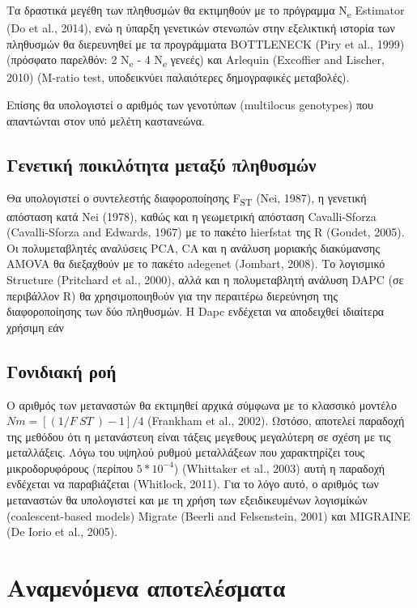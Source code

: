 \documentclass[12pt,a4paper,]{report}
\begin{document}
Τα δραστικά μεγέθη των πληθυσμών θα εκτιμηθούν με το πρόγραμμα
N\textsubscript{e} Estimator (Do et al., 2014), ενώ η ύπαρξη γενετικών
στενωπών στην εξελικτική ιστορία των πληθυσμών θα διερευνηθεί με τα
προγράμματα BOTTLENECK (Piry et al., 1999) (πρόσφατο παρελθόν: 2
N\textsubscript{e} - 4 N\textsubscript{e} γενεές) και Arlequin
(Excoffier and Lischer, 2010) (M-ratio test, υποδεικνύει παλαιότερες
δημογραφικές μεταβολές).

Επίσης θα υπολογιστεί ο αριθμός των γενοτύπων (multilocus genotypes) που
απαντώνται στον υπό μελέτη καστανεώνα.

\hypertarget{---}{%
\subsection{Γενετική ποικιλότητα μεταξύ πληθυσμών}\label{---}}

Θα υπολογιστεί ο συντελεστής διαφοροποίησης F\textsubscript{ST} (Nei,
1987), η γενετική απόσταση κατά Nei (1978), καθώς και η γεωμετρική
απόσταση Cavalli-Sforza (Cavalli-Sforza and Edwards, 1967) με το πακέτο
hierfstat της R (Goudet, 2005). Οι πολυμεταβλητές αναλύσεις PCA, CA και
η ανάλυση μοριακής διακύμανσης AMOVA θα διεξαχθούν με το πακέτο adegenet
(Jombart, 2008). Το λογισμικό Structure (Pritchard et al., 2000), αλλά
και η πολυμεταβλητή ανάλυση DAPC (σε περιβάλλον R) θα χρησιμοποιηθoύν
για την περαιτέρω διερεύνηση της διαφοροποίησης των δύο πληθυσμών. H
Dapc ενδέχεται να αποδειχθεί ιδιαίτερα χρήσιμη εάν

\hypertarget{-}{%
\subsection{Γονιδιακή ροή}\label{-}}

Ο αριθμός των μεταναστών θα εκτιμηθεί αρχικά σύμφωνα με το κλασσικό
μοντέλο \(Nm = [(1 / F~ST~) - 1] / 4\) (Frankham et al., 2002). Ωστόσο,
αποτελεί παραδοχή της μεθόδου ότι η μετανάστευη είναι τάξεις μεγεθους
μεγαλύτερη σε σχέση με τις μεταλλάξεις. Λόγω του υψηλού ρυθμού
μεταλλάξεων που χαρακτηρίζει τους μικροδορυφόρους (περίπου
\(5 * 10^{-4}\)) (Whittaker et al., 2003) αυτή η παραδοχή ενδέχεται να
παραβιάζεται (Whitlock, 2011). Για το λόγο αυτό, ο αριθμός των
μεταναστών θα υπολογιστεί και με τη χρήση των εξειδικευμένων λογισμίκών
(coalescent-based models) Migrate (Beerli and Felsenstein, 2001) και
MIGRAINE (De Iorio et al., 2005).

\hypertarget{-}{%
\section{Αναμενόμενα αποτελέσματα}\label{-}}
\end{document}
